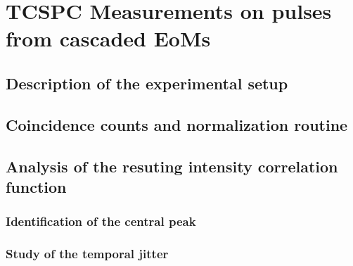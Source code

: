 \chapter{TCSPC Measurements on pulses from cascaded EoMs}
\section{Description of the experimental setup}
\section{Coincidence counts and normalization routine}
\section{Analysis of the resuting intensity correlation function}
\subsection{Identification of the central peak}
\subsection{Study of the temporal jitter}